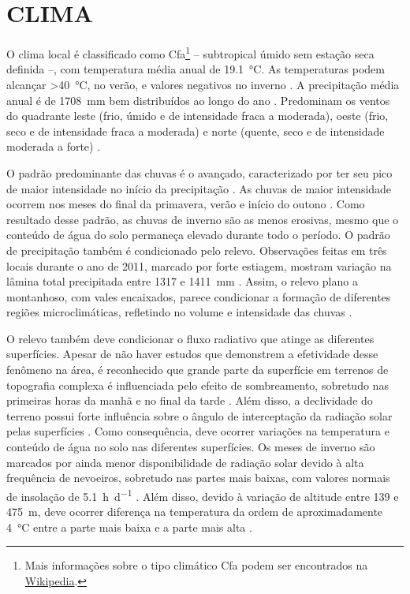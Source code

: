 \section{CLIMA}
\label{sec:chap02-clima}

\def\footcfa{\footnote{Mais informações sobre o tipo climático Cfa podem ser encontrados na 
\href{https://pt.wikipedia.org/wiki/Clima_subtropical_\%C3\%BAmido}{Wikipedia}.}}

O clima local é classificado como Cfa\footcfa{} -- subtropical úmido sem estação seca definida --, com 
temperatura média anual de \SI{19,1}{\celsius}. As temperaturas podem alcançar \SI{>40}{\celsius}, no verão, e 
valores negativos no inverno \cite{HeldweinEtAl2009}. A precipitação média anual é de \SI{1708}{\milli\metre} 
bem distribuídos ao longo do ano \cite{Maluf2000}. Predominam os ventos do quadrante leste (frio, úmido e de 
intensidade fraca a moderada), oeste (frio, seco e de intensidade fraca a moderada) e norte (quente, seco e de 
intensidade moderada a forte) \cite{HeldweinEtAl2009}.

O padrão predominante das chuvas é o avançado, caracterizado por ter seu pico de maior intensidade no início da 
precipitação \cite{MehlEtAl2001}. As chuvas de maior intensidade ocorrem nos meses do final da primavera, 
verão e início do outono \cite{MouraBueno2012}. Como resultado desse padrão, as chuvas de inverno são as 
menos erosivas, mesmo que o conteúdo de água do solo permaneça elevado durante todo o período. O padrão de 
precipitação também é condicionado pelo relevo. Observações feitas em três locais durante o ano de \num{2011}, 
marcado por forte estiagem, mostram variação na lâmina total precipitada entre \num{1317} e \SI{1411}{\mm} 
\cite{MouraBueno2012}. Assim, o relevo plano a montanhoso, com vales encaixados, parece condicionar a formação 
de diferentes regiões microclimáticas, refletindo no volume e intensidade das chuvas \cite{MouraBueno2012}.

O relevo também deve condicionar o fluxo radiativo que atinge as diferentes superfícies. Apesar de não haver 
estudos que demonstrem a efetividade desse fenômeno na área, é reconhecido que grande parte da superfície em 
terrenos de topografia complexa é influenciada pelo efeito de sombreamento, sobretudo nas primeiras horas da 
manhã e no final da tarde \cite{OliphantEtAl2003}. Além disso, a declividade do terreno possui forte influência 
sobre o ângulo de interceptação da radiação solar pelas superfícies \cite{Birkeland1999}. Como consequência, 
deve ocorrer variações na temperatura e conteúdo de água no solo nas diferentes superfícies. Os meses de 
inverno são marcados por ainda menor disponibilidade de radiação solar devido à alta frequência de nevoeiros, 
sobretudo nas partes mais baixas, com valores normais de insolação de \SI{5,1}{\hour\per\day} 
\cite{HeldweinEtAl2009}. Além disso, devido à variação de altitude entre \num{139} e \SI{475}{\metre}, deve 
ocorrer diferença na temperatura da ordem de aproximadamente \SI{4}{\celsius} entre a parte mais baixa e a 
parte mais alta \cite{HeldweinEtAl2009}.

